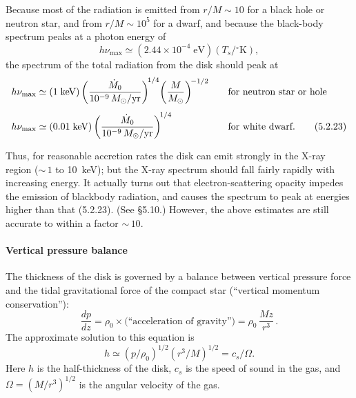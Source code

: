 Because most of the radiation is emitted from $r/M \sim 10$ for a black hole or
neutron star, and from $r/M \sim 10^5$ for a dwarf, and because the black-body
spectrum peaks at a photon energy of
\begin{equation}
h\nu_{\max} \simeq (2.44\times 10^{-4}\;\text{eV})(T_s/{}^\circ\!\text{K}),
\tag{5.2.22}
\end{equation}
the spectrum of the total radiation from the disk should peak at
\begin{alignat}{2}
h\nu_{\max} &\simeq (1\;\text{keV})
\left(\frac{\dot{M}_0}{10^{-9}\,M_\odot/\text{yr}}\right)^{\!1/4}
\!\left(\frac{M}{M_\odot}\right)^{\!-1/2}
&\quad&\text{for neutron star or hole} \notag\\[4pt]
h\nu_{\max} &\simeq (0.01\;\text{keV})
\left(\frac{\dot{M}_0}{10^{-9}\,M_\odot/\text{yr}}\right)^{\!1/4}
&\quad&\text{for white dwarf.}
\tag{5.2.23}
\end{alignat}

Thus, for reasonable accretion rates the disk can emit strongly in the X-ray
region (${\sim}\,1$ to 10~keV); but the X-ray spectrum should fall fairly rapidly with
increasing energy. It actually turns out that electron-scattering opacity impedes
the emission of blackbody radiation, and causes the spectrum to peak at energies
higher than that (5.2.23). (See \S5.10.) However, the above estimates are still
accurate to within a factor ${\sim}\,10$.


\paragraph*{Vertical pressure balance}

The thickness of the disk is governed by a balance between vertical pressure force
and the tidal gravitational force of the compact star (``vertical momentum
conservation''):
\begin{equation}
\frac{dp}{dz} = \rho_0 \times
\bigl(\text{``acceleration of gravity''}\bigr) = \rho_0\,\frac{Mz}{r^3}\,.
\tag{5.2.24}
\end{equation}
The approximate solution to this equation is
\begin{equation}
h \simeq (p/\rho_0)^{1/2}(r^3/M)^{1/2} = c_s/\Omega.
\tag{5.2.25}
\end{equation}
Here $h$ is the half-thickness of the disk, $c_s$ is the speed of sound in the gas, and
$\Omega = (M/r^3)^{1/2}$ is the angular velocity of the gas.

